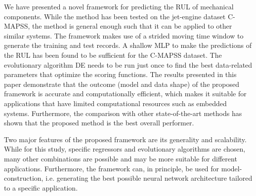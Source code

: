 \documentclass[preprint,12pt]{elsarticle}%
\begin{document}
We have presented a novel framework for predicting the RUL of mechanical
components. While the method has been tested on the jet-engine dataset
C-MAPSS, the method is general enough such that it can be applied to other similar
systems. The framework makes use of a strided moving time window to generate
the training and test records. A shallow MLP to make the predictions of the RUL
has been found to be sufficient for the C-MAPSS dataset. The evolutionary
algorithm DE needs to be run just once to find the best data-related
parameters that optimize the scoring functions. The results presented in this
paper demonstrate that the outcome (model and data shape) of the proposed framework is accurate and computationally
efficient, which makes it suitable for applications that have
limited computational resources such as embedded systems. Furthermore, the
comparison with other state-of-the-art methods has shown that the proposed
method is the best overall performer.

Two major features of the proposed framework are its generality and
scalability. While for this study, specific regressors and evolutionary
algorithms are chosen, many other combinations are possible and may be more
suitable for different applications. Furthermore, the framework can, in
principle, be used for model-construction, i.e. generating the best possible
neural network architecture tailored to a specific application.



%

%


\clearpage


\onecolumn%


\bigskip%
\end{document}
